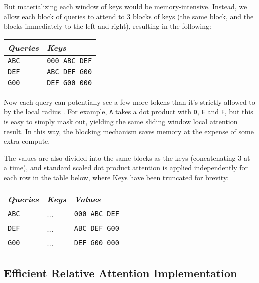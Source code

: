 \documentclass[11pt,a4paper]{article}
\begin{document}
But materializing each window of keys would be memory-intensive. Instead, we allow each block of queries to attend to 3 blocks of keys (the same block, and the blocks immediately to the left and right), resulting in the following:

\begin{tabular}{l|l} 
{\em Queries} & {\em Keys} \\ \hline
\texttt{ABC}  & \texttt{000 ABC DEF} \\
\texttt{DEF}  & \texttt{ABC DEF G00}  \\ 
\texttt{G00}          & \texttt{DEF G00 000} \\
\end{tabular}

Now each query can potentially see a few more tokens than it's strictly allowed to by the local radius .  For example, \texttt{A} takes a dot product with \texttt{D}, \texttt{E} and \texttt{F}, but this is easy to simply mask out, yielding the same sliding window local attention result. In this way, the blocking mechanism saves memory at the expense of some extra compute.

The values are also divided into the same blocks as the keys (concatenating 3 at a time), and standard scaled dot product attention is applied independently for each row in the table below, where Keys have been truncated for brevity:



 \begin{tabular}{l|l|l} 
 {\em Queries} & {\em Keys} & {\em Values} \\ \hline
 \texttt{ABC}    & ...  & \texttt{000 ABC DEF} \\
 \texttt{DEF}    & ...   & \texttt{ABC DEF G00}  \\
 \texttt{G00}            & ...  & \texttt{DEF G00 000}  \\
 \end{tabular}

\subsection*{Efficient Relative Attention Implementation}
\end{document}
